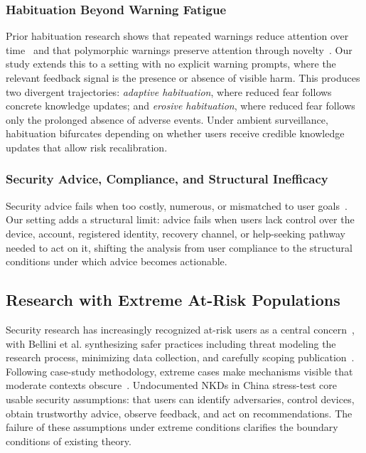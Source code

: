 \documentclass[conference,compsoc]{IEEEtran}
\begin{document}
\subsubsection{Habituation Beyond Warning Fatigue}

Prior habituation research shows that repeated warnings reduce attention over time~\cite{vance2018tuning} and that polymorphic warnings preserve attention through novelty~\cite{anderson2015polymorphic,felt2012android, vance2017we}. Our study extends this to a setting with no explicit warning prompts, where the relevant feedback signal is the presence or absence of visible harm. This produces two divergent trajectories: \emph{adaptive habituation}, where reduced fear follows concrete knowledge updates; and \emph{erosive habituation}, where reduced fear follows only the prolonged absence of adverse events. Under ambient surveillance, habituation bifurcates depending on whether users receive credible knowledge updates that allow risk recalibration.


\subsubsection{Security Advice, Compliance, and Structural Inefficacy}

Security advice fails when too costly, numerous, or mismatched to user goals~\cite{herley2009so,ion2015no,redmiles2020comprehensive,hielscher2023employees}. Our setting adds a structural limit: advice fails when users lack control over the device, account, registered identity, recovery channel, or help-seeking pathway needed to act on it, shifting the analysis from user compliance to the structural conditions under which advice becomes actionable.

\subsection{Research with Extreme At-Risk Populations}
\label{2.4}

Security research has increasingly recognized at-risk users as a central concern~\cite{warford2022sok}, with Bellini et al. synthesizing safer practices including threat modeling the research process, minimizing data collection, and carefully scoping publication~\cite{bellini2024sok}. Following case-study methodology, extreme cases make mechanisms visible that moderate contexts obscure~\cite{flyvbjerg2004five}. Undocumented NKDs in China stress-test core usable security assumptions: that users can identify adversaries, control devices, obtain trustworthy advice, observe feedback, and act on recommendations. The failure of these assumptions under extreme conditions clarifies the boundary conditions of existing theory.
\end{document}
